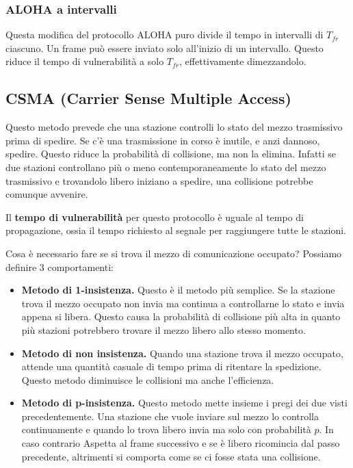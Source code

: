         \subsubsection{ALOHA a intervalli}
            Questa modifica del protocollo ALOHA puro divide il tempo in intervalli di $T_{fr}$ ciascuno. Un frame può essere inviato solo all'inizio di un intervallo. Questo riduce il tempo di vulnerabilità a solo $T_{fr}$, effettivamente dimezzandolo.
            
    \subsection{CSMA (Carrier Sense Multiple Access)}
        Questo metodo prevede che una stazione controlli lo stato del mezzo trasmissivo prima di spedire. Se c'è una trasmissione in corso è inutile, e anzi dannoso, spedire. Questo riduce la probabilità di collisione, ma non la elimina. Infatti se due stazioni controllano più o meno contemporaneamente lo stato del mezzo trasmissivo e trovandolo libero iniziano a spedire, una collisione potrebbe comunque avvenire.
        
        Il \textbf{tempo di vulnerabilità} per questo protocollo è uguale al tempo di propagazione, ossia il tempo richiesto al segnale per raggiungere tutte le stazioni.
        
        Cosa è necessario fare se si trova il mezzo di comunicazione occupato? Possiamo definire 3 comportamenti:
        \begin{itemize}
            \item \textbf{Metodo di 1-insistenza.} Questo è il metodo più semplice. Se la stazione trova il mezzo occupato non invia ma continua a controllarne lo stato e invia appena si libera. Questo causa la probabilità di collisione più alta in quanto più stazioni potrebbero trovare il mezzo libero allo stesso momento.
            
            \item \textbf{Metodo di non insistenza.} Quando una stazione trova il mezzo occupato, attende una quantità casuale di tempo prima di ritentare la spedizione. Questo metodo diminuisce le collisioni ma anche l'efficienza.
            
            \item \textbf{Metodo di p-insistenza.} Questo metodo mette insieme i pregi dei due visti precedentemente. Una stazione che vuole inviare sul mezzo lo controlla continuamente e quando lo trova libero invia ma solo con probabilità $p$. In caso contrario Aspetta al frame successivo e se è libero ricomincia dal passo precedente, altrimenti si comporta come se ci fosse stata una collisione.
        \end{itemize}
        
